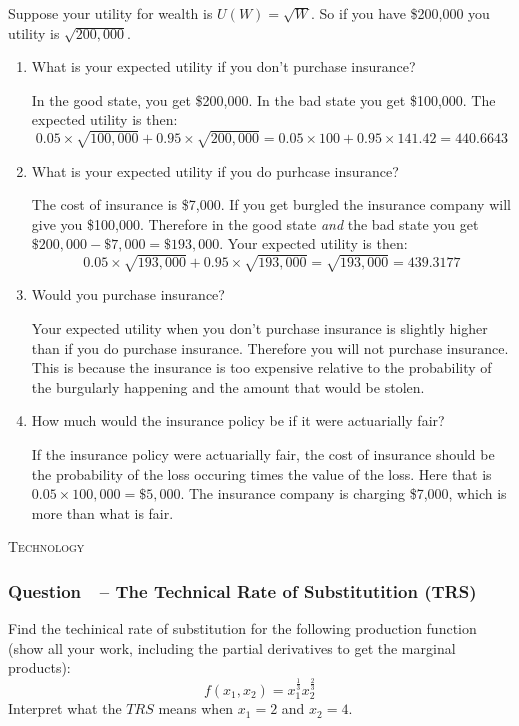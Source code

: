 \documentclass[12pt]{article}
\newcommand{\topic}[1]{\medskip\begin{center}\large\textsc{#1}\normalsize
  \end{center}}
\newcounter{question}[section]
\newcommand{\question}[1]{\refstepcounter{question}
  \subsubsection*{Question~\thequestion~-- #1}}
\newenvironment{subquestions}{
  \begin{enumerate}[label=(\roman*)]}{\end{enumerate}}
\begin{document}
Suppose your utility for wealth is $U\left( W \right)=\sqrt{W}$. So if you have
\$200,000 you utility is $\sqrt{200,000}$.

\begin{subquestions}
  \item What is your expected utility if you don't purchase insurance?

    \textcolor{solution-color}{
      In the good state, you get \$200,000. In the bad state you get \$100,000.
      The expected utility is then:
      \[
        0.05 \times \sqrt{100,000} + 0.95 \times \sqrt{200,000}=
        0.05 \times 100 + 0.95 \times 141.42 = 440.6643
      \]
    }
  \item What is your expected utility if you do purhcase insurance?

    \textcolor{solution-color}{
      The cost of insurance is \$7,000. If you get burgled the insurance
      company will give you \$100,000. Therefore in the good state \emph{and}
      the bad state you get $\$200,000-\$7,000=\$193,000$.
      Your expected utility is then:
      \[
        0.05 \times \sqrt{193,000} + 0.95 \times \sqrt{193,000}=
        \sqrt{193,000} = 439.3177
      \]
    }
  \item Would you purchase insurance?

    \textcolor{solution-color}{
      Your expected utility when you don't purchase insurance is slightly
      higher than if you do purchase insurance. Therefore you will not purchase
      insurance. This is because the insurance is too expensive relative to the
      probability of the burgularly happening and the amount that would be
      stolen.
    }

  \item How much would the insurance policy be if it were actuarially fair?

    \textcolor{solution-color}{
      If the insurance policy were actuarially fair, the cost of insurance
      should be the probability of the loss occuring times the value of the
      loss. Here that is $0.05 \times 100,000=\$5,000$. The insurance company
      is charging \$7,000, which is more than what is fair.
    }
\end{subquestions}
\topic{Technology}
\question{The Technical Rate of Substitutition (TRS)}
Find the techinical rate of substitution for the following production function
(show all your work, including the partial derivatives to get the marginal
products):
\[
  f\left( x_1,x_2 \right)=x_1^{\frac{1}{3}}x_2^{\frac{2}{3}}
\]
Interpret what the $TRS$ means when $x_1 = 2$ and $x_2 = 4$.
\end{document}
